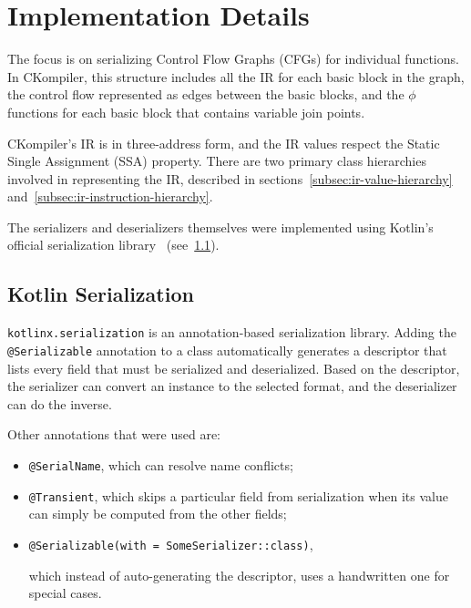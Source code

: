 \documentclass[lettersize,journal]{IEEEtran}
\begin{document}
    \section{Implementation Details}\label{sec:implementation-details}

    The focus is on serializing Control Flow Graphs (CFGs) for individual functions.
    In CKompiler, this structure includes all the IR for each basic block in the graph, the control flow represented
    as edges between the basic blocks, and the $\phi$ functions for each basic block that contains variable join points.

    CKompiler's IR is in three-address form, and the IR values respect the Static Single Assignment (SSA) property.
    There are two primary class hierarchies involved in representing the IR, described in
    sections~\ref{subsec:ir-value-hierarchy} and~\ref{subsec:ir-instruction-hierarchy}.

    The serializers and deserializers themselves were implemented using Kotlin's official serialization
    library~\cite{kotlinx-serialization, kotlinx-serialization-git} (see~\ref{subsec:kotlinx-serialization}).

    \subsection{Kotlin Serialization}\label{subsec:kotlinx-serialization}

    \texttt{kotlinx.serialization} is an annotation-based serialization library.
    Adding the \texttt{@Serializable} annotation to a class automatically generates a descriptor that lists every
    field that must be serialized and deserialized.
    Based on the descriptor, the serializer can convert an instance to the selected format, and the deserializer can do
    the inverse.

    Other annotations that were used are:
    \begin{itemize}
        \item \texttt{@SerialName}, which can resolve name conflicts;
        \item \texttt{@Transient}, which skips a particular field from serialization when its value can simply be
        computed from the other fields;
        \item {\small\texttt{@Serializable(with~=~SomeSerializer::class)},\par} which instead of auto-generating the descriptor,
        uses a handwritten one for special cases.
    \end{itemize}
\end{document}
